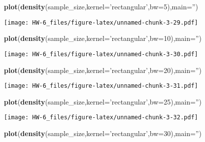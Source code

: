 \documentclass[]{article}
\newenvironment{Shaded}{\begin{snugshade}}{\end{snugshade}}
\newcommand{\DataTypeTok}[1]{\textcolor[rgb]{0.13,0.29,0.53}{#1}}
\newcommand{\DecValTok}[1]{\textcolor[rgb]{0.00,0.00,0.81}{#1}}
\newcommand{\KeywordTok}[1]{\textcolor[rgb]{0.13,0.29,0.53}{\textbf{#1}}}
\newcommand{\NormalTok}[1]{#1}
\newcommand{\StringTok}[1]{\textcolor[rgb]{0.31,0.60,0.02}{#1}}
\begin{document}
\begin{Shaded}
\begin{Highlighting}[]
\KeywordTok{plot}\NormalTok{(}\KeywordTok{density}\NormalTok{(sample_size,}\DataTypeTok{kernel=}\StringTok{'rectangular'}\NormalTok{,}\DataTypeTok{bw=}\DecValTok{5}\NormalTok{),}\DataTypeTok{main=}\StringTok{''}\NormalTok{)}
\end{Highlighting}
\end{Shaded}

\texttt{[image: HW-6\_files/figure-latex/unnamed-chunk-3-29.pdf]}

\begin{Shaded}
\begin{Highlighting}[]
\KeywordTok{plot}\NormalTok{(}\KeywordTok{density}\NormalTok{(sample_size,}\DataTypeTok{kernel=}\StringTok{'rectangular'}\NormalTok{,}\DataTypeTok{bw=}\DecValTok{10}\NormalTok{),}\DataTypeTok{main=}\StringTok{''}\NormalTok{)}
\end{Highlighting}
\end{Shaded}

\texttt{[image: HW-6\_files/figure-latex/unnamed-chunk-3-30.pdf]}

\begin{Shaded}
\begin{Highlighting}[]
\KeywordTok{plot}\NormalTok{(}\KeywordTok{density}\NormalTok{(sample_size,}\DataTypeTok{kernel=}\StringTok{'rectangular'}\NormalTok{,}\DataTypeTok{bw=}\DecValTok{20}\NormalTok{),}\DataTypeTok{main=}\StringTok{''}\NormalTok{)}
\end{Highlighting}
\end{Shaded}

\texttt{[image: HW-6\_files/figure-latex/unnamed-chunk-3-31.pdf]}

\begin{Shaded}
\begin{Highlighting}[]
\KeywordTok{plot}\NormalTok{(}\KeywordTok{density}\NormalTok{(sample_size,}\DataTypeTok{kernel=}\StringTok{'rectangular'}\NormalTok{,}\DataTypeTok{bw=}\DecValTok{25}\NormalTok{),}\DataTypeTok{main=}\StringTok{''}\NormalTok{)}
\end{Highlighting}
\end{Shaded}

\texttt{[image: HW-6\_files/figure-latex/unnamed-chunk-3-32.pdf]}

\begin{Shaded}
\begin{Highlighting}[]
\KeywordTok{plot}\NormalTok{(}\KeywordTok{density}\NormalTok{(sample_size,}\DataTypeTok{kernel=}\StringTok{'rectangular'}\NormalTok{,}\DataTypeTok{bw=}\DecValTok{30}\NormalTok{),}\DataTypeTok{main=}\StringTok{''}\NormalTok{)}
\end{Highlighting}
\end{Shaded}
\end{document}
